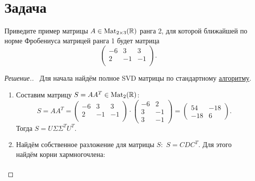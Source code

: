 \documentclass[a4paper]{article}
\newcommand{\Mat}{\operatorname{Mat}}
\theoremstyle{remark}
\begin{document}
    \section*{Задача }
        Приведите пример матрицы $A \in \Mat_{2\times 3}(\RR)$ ранга 2, для которой 
        ближайшей по норме Фробениуса матрицей ранга 1 будет матрица
        $$
        \begin{pmatrix}
            -6 & 3 & 3 \\
            2 & -1 & -1 \\
        \end{pmatrix}.
        $$
        \begin{proof}[Решение.] \ 
          Для начала найдём полное SVD матрицы по стандартному \href{https://docviewer.yandex.ru/view/1203695933/?*=4ryhHsfuMOpXKV9Y7YnIVhDS7hd7InVybCI6InlhLWRpc2stcHVibGljOi8vVUo4QnpCMHExNnpuNlljdUJYRTViUFRmcFVUTm5QeitYYnhiWCtteWoxU0tjVzhlcUdaMG9MMXk2QXFEVWRZR3EvSjZicG1SeU9Kb25UM1ZvWG5EYWc9PTovU2VtaW5hcjMxX3NlbWluYXIucGRmIiwidGl0bGUiOiJTZW1pbmFyMzFfc2VtaW5hci5wZGYiLCJub2lmcmFtZSI6ZmFsc2UsInVpZCI6IjEyMDM2OTU5MzMiLCJ0cyI6MTYyNDI3NTI2NDM1MywieXUiOiIyNzM0OTIzMDkxNTkzMDEzMDIzIn0%3D}{алгоритму}. 
          \begin{enumerate}
            \item Составим матрицу $S = AA^T \in \Mat_2(\RR)$:
            \begin{equation}
              S = AA^T = 
              \begin{pmatrix}
                -6 & 3 & 3 \\
                2 & -1 & -1 \\
              \end{pmatrix} \cdot \begin{pmatrix}
                -6 & 2 \\
                3 & -1 \\
                3 & -1
              \end{pmatrix} =
              \begin{pmatrix}
                54 & -18 \\
                -18 & 6
              \end{pmatrix}.
            \end{equation}
            Тогда $S = U \Sigma \Sigma^T U^T$.
            \item Найдём собственное разложение для матрицы $S:$ $S = CDC^T$. Для этого найдём корни хармногочлена:
            \begin{align*}

\end{align*}
\end{enumerate}
\end{proof}
\end{document}
